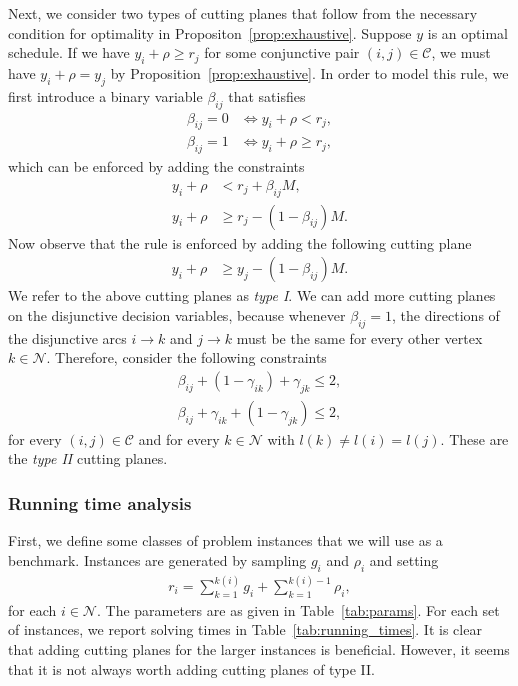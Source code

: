 \documentclass[a4paper]{article}
\theoremstyle{definition}
\theoremstyle{plain}
\begin{document}
Next, we consider two types of cutting planes that follow from the necessary condition
for optimality in Propositon~\ref{prop:exhaustive}.
%
Suppose $y$ is an optimal schedule. If we have $y_{i} + \rho \geq r_{j}$ for
some conjunctive pair $(i,j) \in \mathcal{C}$, we must have $y_{i} + \rho = y_{j}$
by Proposition~\ref{prop:exhaustive}. In order to model this rule, we first introduce a binary
variable $\beta_{ij}$ that satisfies
\begin{align*}
  \beta_{ij} = 0 &\iff y_{i} + \rho < r_{j} , \\
  \beta_{ij} = 1 &\iff y_{i} + \rho \geq r_{j} ,
\end{align*}
which can be enforced by adding the constraints
\begin{align*}
  y_{i} + \rho &< r_{j} + \beta_{ij}M , \\
  y_{i} + \rho &\geq r_{j} - (1 - \beta_{ij}) M .
\end{align*}
Now observe that the rule is enforced by adding the following cutting plane
\begin{align*}
  y_{i} + \rho &\geq y_{j} - (1 - \beta_{ij}) M .
\end{align*}
We refer to the above cutting planes as \textit{type I}.
%
We can add more cutting planes on the disjunctive decision variables, because
whenever $\beta_{ij} = 1$, the directions of the disjunctive arcs $i \rightarrow k$ and
$j \rightarrow k$ must be the same for every other vertex $k \in \mathcal{N}$. Therefore,
consider the following constraints
\begin{align*}
  \beta_{ij} + (1 - \gamma_{ik}) + \gamma_{jk} \leq 2 , \\
  \beta_{ij} + \gamma_{ik} + (1 - \gamma_{jk}) \leq 2 ,
\end{align*}
for every $(i,j) \in \mathcal{C}$ and for every $k \in \mathcal{N}$ with $l(k) \neq l(i) = l(j)$.
These are the \textit{type II} cutting planes.


\subsubsection*{Running time analysis}

First, we define some classes of problem instances that we will use as a benchmark.
%
Instances are generated by sampling $g_{i}$ and $\rho_{i}$ and setting
\begin{align*}
  r_{i} = \sum_{k=1}^{k(i)} g_{i} + \sum_{k=1}^{k(i) - 1} \rho_{i} ,
\end{align*}
for each $i \in \mathcal{N}$.
%
The parameters are as given in Table~\ref{tab:params}. For each set of instances, we report
solving times in Table~\ref{tab:running_times}. It is clear that adding cutting planes for the
larger instances is beneficial. However, it seems that it is not always worth
adding cutting planes of type II.
\end{document}
